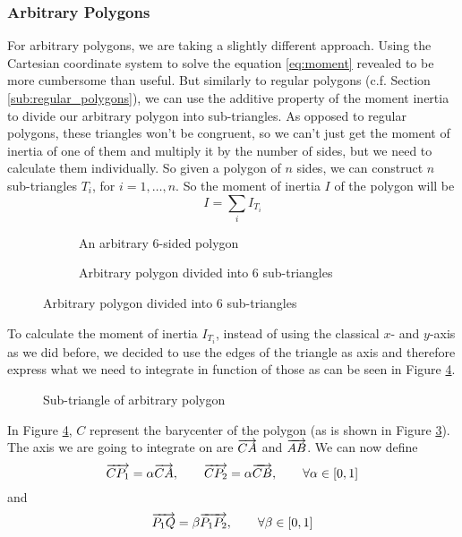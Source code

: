 \subsubsection{Arbitrary Polygons}

For arbitrary polygons, we are taking a slightly different approach. Using the
Cartesian coordinate system to solve the equation \ref{eq:moment} revealed to be
more cumbersome than useful. But similarly to regular polygons (c.f. Section
\ref{sub:regular_polygons}), we can use the additive property of the moment
inertia to divide our arbitrary polygon into sub-triangles. As opposed to
regular polygons, these triangles won't be congruent, so we can't just get the
moment of inertia of one of them and multiply it by the number of sides, but we
need to calculate them individually. So given a polygon of $n$ sides, we can
construct $n$ sub-triangles $T_i$, for $i = 1, \dots, n$. So the moment of
inertia $I$ of the polygon will be
\begin{equation}
	I = \sum_i I_{T_i}
\end{equation}
\begin{figure}[H]
	\centering
	\begin{subfigure}[]{.5\textwidth}
		\centering
		\caption{An arbitrary 6-sided polygon}
		\label{fig:arbitrary}
	\end{subfigure}
	\begin{subfigure}[]{.49\textwidth}
		\centering
		\caption{Arbitrary polygon divided into 6 sub-triangles}
		\label{fig:abitrary_divded}
	\end{subfigure}
\end{figure}

To calculate the moment of inertia $I_{T_i}$, instead of using the classical
$x$- and $y$-axis as we did before, we decided to use the edges of the triangle
as axis and therefore express what we need to integrate in function of those as
can be seen in Figure \ref{fig:abitrary_subtriangle}.
\begin{figure}[H]
	\centering
	\caption{Sub-triangle of arbitrary polygon}
	\label{fig:abitrary_subtriangle}
\end{figure}

In Figure \ref{fig:abitrary_subtriangle}, $C$ represent the barycenter of the
polygon (as is shown in Figure \ref{fig:abitrary_divded}). The axis we are going
to integrate on are $\overrightarrow{CA}$ and $\overrightarrow{AB}$.
We can now define
\begin{equation} \label{eq:alpha}
	\overrightarrow{CP_1} = \alpha \overrightarrow{CA}, \qquad \overrightarrow{CP_2} = \alpha
	\overrightarrow{CB}, \qquad \forall \alpha \in [0, 1]
\end{equation}
and
$$ \overrightarrow{P_1Q} = \beta \overrightarrow{P_1P_2}, \qquad \forall \beta \in [0, 1] $$

